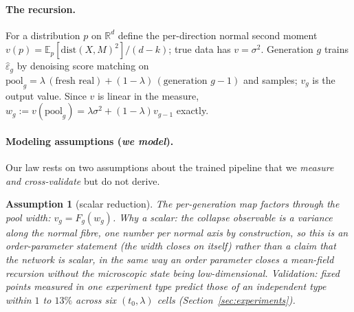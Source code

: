 \documentclass[11pt]{article}
\newtheorem{assumption}{Assumption}
\theoremstyle{remark}
\newcommand{\epshat}{\hat\varepsilon}
\newcommand{\R}{\mathbb{R}}
\newcommand{\E}{\mathbb{E}}
\newcommand{\dist}{\mathrm{dist}}
\newcommand{\sigsq}{\sigma^2}
\begin{document}
\paragraph{The recursion.} For a distribution $p$ on $\R^d$ define the per-direction
normal second moment $v(p)=\E_p[\dist(X,M)^2]/(d-k)$; true data has $v=\sigsq$.
Generation $g$ trains $\epshat_g$ by denoising score matching on
$\mathrm{pool}_g=\lambda\,(\text{fresh real})+(1-\lambda)\,(\text{generation }g\!-\!1)$
and samples; $v_g$ is the output value. Since $v$ is linear in the measure,
$w_g:=v(\mathrm{pool}_g)=\lambda\sigsq+(1-\lambda)v_{g-1}$ exactly.

\paragraph{Modeling assumptions (\emph{we model}).} Our law rests on two assumptions
about the trained pipeline that we \emph{measure and cross-validate} but do not derive.

\begin{assumption}[scalar reduction]\label{ass:a0}
The per-generation map factors through the pool width: $v_g=F_g(w_g)$.
\emph{Why a scalar:} the collapse observable is a \emph{variance} along the normal
fibre, one number per normal axis by construction, so this is an order-parameter
statement (the width closes on itself) rather than a claim that the network is scalar, in
the same way an order parameter closes a mean-field recursion without the microscopic state
being low-dimensional.
\emph{Validation:} fixed points measured in one experiment type predict those of an
independent type within $1$ to $13\%$ across six $(t_0,\lambda)$ cells
(Section~\ref{sec:experiments}).
\end{assumption}
\end{document}
